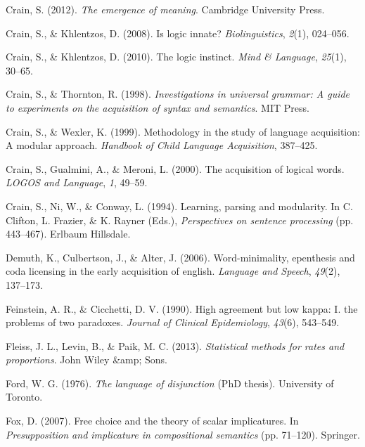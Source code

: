 \documentclass[oneside]{report}
\theoremstyle{definition}
\theoremstyle{definition}
\theoremstyle{definition}
\theoremstyle{remark}
\begin{document}
\hypertarget{ref-crain2012emergence}{}
Crain, S. (2012). \emph{The emergence of meaning}. Cambridge University
Press.

\hypertarget{ref-crain2008logic}{}
Crain, S., \& Khlentzos, D. (2008). Is logic innate?
\emph{Biolinguistics}, \emph{2}(1), 024--056.

\hypertarget{ref-crain2010logic}{}
Crain, S., \& Khlentzos, D. (2010). The logic instinct. \emph{Mind \&
Language}, \emph{25}(1), 30--65.

\hypertarget{ref-crain1998investigations}{}
Crain, S., \& Thornton, R. (1998). \emph{Investigations in universal
grammar: A guide to experiments on the acquisition of syntax and
semantics}. MIT Press.

\hypertarget{ref-crain1999methodology}{}
Crain, S., \& Wexler, K. (1999). Methodology in the study of language
acquisition: A modular approach. \emph{Handbook of Child Language
Acquisition}, 387--425.

\hypertarget{ref-crain2000acquisition}{}
Crain, S., Gualmini, A., \& Meroni, L. (2000). The acquisition of
logical words. \emph{LOGOS and Language}, \emph{1}, 49--59.

\hypertarget{ref-crain1994learning}{}
Crain, S., Ni, W., \& Conway, L. (1994). Learning, parsing and
modularity. In C. Clifton, L. Frazier, \& K. Rayner (Eds.),
\emph{Perspectives on sentence processing} (pp. 443--467). Erlbaum
Hillsdale.

\hypertarget{ref-demuth2006word}{}
Demuth, K., Culbertson, J., \& Alter, J. (2006). Word-minimality,
epenthesis and coda licensing in the early acquisition of english.
\emph{Language and Speech}, \emph{49}(2), 137--173.

\hypertarget{ref-feinstein1990high}{}
Feinstein, A. R., \& Cicchetti, D. V. (1990). High agreement but low
kappa: I. the problems of two paradoxes. \emph{Journal of Clinical
Epidemiology}, \emph{43}(6), 543--549.

\hypertarget{ref-fleiss2013statistical}{}
Fleiss, J. L., Levin, B., \& Paik, M. C. (2013). \emph{Statistical
methods for rates and proportions}. John Wiley \&amp; Sons.

\hypertarget{ref-ford1976language}{}
Ford, W. G. (1976). \emph{The language of disjunction} (PhD thesis).
University of Toronto.

\hypertarget{ref-fox2007free}{}
Fox, D. (2007). Free choice and the theory of scalar implicatures. In
\emph{Presupposition and implicature in compositional semantics} (pp.
71--120). Springer.
\end{document}
